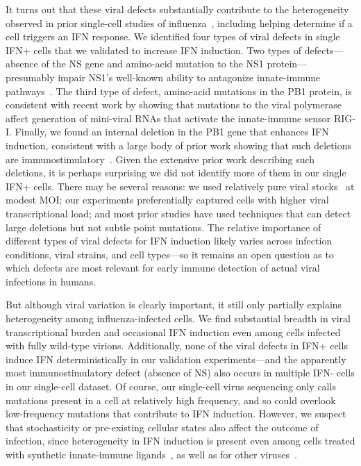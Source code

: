 \documentclass[9pt,lineno]{template}
\begin{document}
It turns out that these viral defects substantially contribute to the heterogeneity observed in prior single-cell studies of influenza~\citep{russell2018extreme, steuerman2018dissection, heldt2015single, sjaastad2018distinct}, including helping determine if a cell triggers an IFN response.
We identified four types of viral defects in single IFN+ cells that we validated to increase IFN induction. 
Two types of defects---absence of the NS gene and amino-acid mutation to the NS1 protein---presumably impair NS1's well-known ability to antagonize innate-immune pathways~\citep{garcia1998influenza, hale2008multifunctional}.
The third type of defect, amino-acid mutations in the PB1 protein, is consistent with recent work by \citet{velthuis2018mini} showing that mutations to the viral polymerase affect generation of mini-viral RNAs that activate the innate-immune sensor RIG-I.
Finally, we found an internal deletion in the PB1 gene that enhances IFN induction, consistent with a large body of prior work showing that such deletions are immunostimulatory~\citep{baum2010preference, tapia2013defective, boergeling2015evidence, dimmock2015cloned}.
Given the extensive prior work describing such deletions, it is perhaps surprising we did not identify more of them in our single IFN+ cells.
There may be several reasons: we used relatively pure viral stocks~\citep{xue2016propagation} at modest MOI; our experiments preferentially captured cells with higher viral transcriptional load; and most prior studies have used techniques that can detect large deletions but not subtle point mutations.
The relative importance of different types of viral defects for IFN induction likely varies across infection conditions, viral strains, and cell types---so it remains an open question as to which defects are most relevant for early immune detection of actual viral infections in humans.

But although viral variation is clearly important, it still only partially explains heterogeneity among influenza-infected cells.
We find substantial breadth in viral transcriptional burden and occasional IFN induction even among cells infected with fully wild-type virions.
Additionally, none of the viral defects in IFN+ cells induce IFN deterministically in our validation experiments---and the apparently most immunostimulatory defect (absence of NS) also occurs in multiple IFN- cells in our single-cell dataset.
Of course, our single-cell virus sequencing only calls mutations present in a cell at relatively high frequency, and so could overlook low-frequency mutations that contribute to IFN induction.
However, we suspect that stochasticity or pre-existing cellular states also affect the outcome of infection, since heterogeneity in IFN induction is present even among cells treated with synthetic innate-immune ligands~\citep{shalek2013single, shalek2014single, wimmers2018single, bhushal2017cell}, as well as for other viruses~\citep{oneal2018west}.
\end{document}
